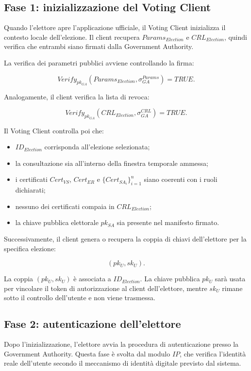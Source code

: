 \documentclass[a4paper,12pt]{article}
\begin{document}
\subsection{Fase 1: inizializzazione del Voting Client}

Quando l'elettore apre l'applicazione ufficiale, il Voting Client inizializza il contesto locale dell'elezione. 
Il client recupera \(Params_{Election}\) e \(CRL_{Election}\), quindi verifica che entrambi siano firmati dalla Government Authority.

La verifica dei parametri pubblici avviene controllando la firma:

\[
	Verify_{pk_{GA}}(Params_{Election}, \sigma_{GA}^{Params}) = TRUE.
\]

Analogamente, il client verifica la lista di revoca:

\[
	Verify_{pk_{GA}}(CRL_{Election}, \sigma_{GA}^{CRL}) = TRUE.
\]

Il Voting Client controlla poi che:

\begin{itemize}
	\item \(ID_{Election}\) corrisponda all'elezione selezionata;
	\item la consultazione sia all'interno della finestra temporale ammessa;
	\item i certificati \(Cert_{VS}\), \(Cert_{ER}\) e \(\{Cert_{SA_i}\}_{i=1}^{n}\) siano coerenti con i ruoli dichiarati;
	\item nessuno dei certificati compaia in \(CRL_{Election}\);
	\item la chiave pubblica elettorale \(pk_{SA}\) sia presente nel manifesto firmato.
\end{itemize}

Successivamente, il client genera o recupera la coppia di chiavi dell'elettore per la specifica elezione:

\[
	(pk_U, sk_U).
\]

La coppia \((pk_U, sk_U)\) \`e associata a \(ID_{Election}\). 
La chiave pubblica \(pk_U\) sar\`a usata per vincolare il token di autorizzazione al client dell'elettore, mentre \(sk_U\) rimane sotto il controllo dell'utente e non viene trasmessa.

\subsection{Fase 2: autenticazione dell'elettore}

Dopo l'inizializzazione, l'elettore avvia la procedura di autenticazione presso la Government Authority. 
Questa fase \`e svolta dal modulo \(IP\), che verifica l'identit\`a reale dell'utente secondo il meccanismo di identit\`a digitale previsto dal sistema.
\end{document}

